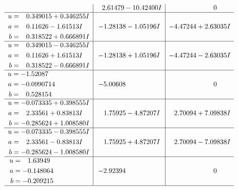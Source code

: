 \documentclass[1p]{elsarticle_modified}
\theoremstyle{definition}
\begin{document}
$$\begin{array}{c|c|c}
 & \phantom{-}2.61479 - 10.42400 I & \phantom{-0.000000 } 0 \\ \hline\begin{aligned}
u &= \phantom{-}0.349015 + 0.346255 I \\
a &= \phantom{-}0.11626 - 1.61513 I \\
b &= \phantom{-}0.318522 + 0.666891 I\end{aligned}
 & -1.28138 - 1.05196 I & -4.47244 + 2.63035 I \\ \hline\begin{aligned}
u &= \phantom{-}0.349015 - 0.346255 I \\
a &= \phantom{-}0.11626 + 1.61513 I \\
b &= \phantom{-}0.318522 - 0.666891 I\end{aligned}
 & -1.28138 + 1.05196 I & -4.47244 - 2.63035 I \\ \hline\begin{aligned}
u &= -1.52087\phantom{ +0.000000I} \\
a &= -0.0990714\phantom{ +0.000000I} \\
b &= \phantom{-}0.528154\phantom{ +0.000000I}\end{aligned}
 & -5.00608\phantom{ +0.000000I} & \phantom{-0.000000 } 0 \\ \hline\begin{aligned}
u &= -0.073335 + 0.398555 I \\
a &= \phantom{-}2.33561 + 0.83813 I \\
b &= -0.285624 + 1.008580 I\end{aligned}
 & \phantom{-}1.75925 - 4.87207 I & \phantom{-}2.70094 + 7.09838 I \\ \hline\begin{aligned}
u &= -0.073335 - 0.398555 I \\
a &= \phantom{-}2.33561 - 0.83813 I \\
b &= -0.285624 - 1.008580 I\end{aligned}
 & \phantom{-}1.75925 + 4.87207 I & \phantom{-}2.70094 - 7.09838 I \\ \hline\begin{aligned}
u &= \phantom{-}1.63949\phantom{ +0.000000I} \\
a &= -0.148064\phantom{ +0.000000I} \\
b &= -0.209215\phantom{ +0.000000I}\end{aligned}
 & -2.92394\phantom{ +0.000000I} & \phantom{-0.000000 } 0\\
 \hline 
 \end{array}$$\newpage\newpage\renewcommand{\arraystretch}{1}
\end{document}
